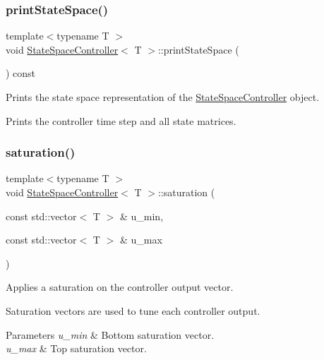\subsubsection{\texorpdfstring{print\+State\+Space()}{printStateSpace()}}
{\footnotesize\ttfamily template$<$typename T $>$ \\
void \hyperlink{classStateSpaceController}{State\+Space\+Controller}$<$ T $>$\+::print\+State\+Space (\begin{DoxyParamCaption}{ }\end{DoxyParamCaption}) const}



Prints the state space representation of the \hyperlink{classStateSpaceController}{State\+Space\+Controller} object. 

Prints the controller time step and all state matrices. \mbox{\label{classStateSpaceController_a865cbded7c2a220adcbfec1d6caea616}} 
\subsubsection{\texorpdfstring{saturation()}{saturation()}\hspace{0.1cm}{\footnotesize\ttfamily [1/2]}}
{\footnotesize\ttfamily template$<$typename T $>$ \\
void \hyperlink{classStateSpaceController}{State\+Space\+Controller}$<$ T $>$\+::saturation (\begin{DoxyParamCaption}\item[{const std\+::vector$<$ T $>$ \&}]{u\+\_\+min,  }\item[{const std\+::vector$<$ T $>$ \&}]{u\+\_\+max }\end{DoxyParamCaption})\hspace{0.3cm}{\ttfamily [protected]}}



Applies a saturation on the controller output vector. 

Saturation vectors are used to tune each controller output. 
\begin{DoxyParams}{Parameters}
{\em u\+\_\+min} & Bottom saturation vector. \\
\hline
{\em u\+\_\+max} & Top saturation vector. \\
\hline
\end{DoxyParams}
\mbox{\label{classStateSpaceController_adf60d82cf62f5cfcf77ca80b294599e5}} 
